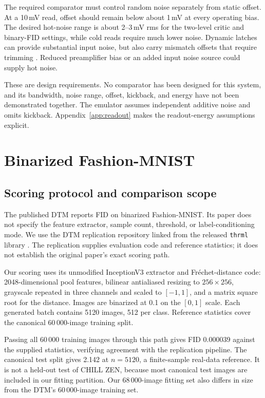 \documentclass[reprint,amsmath,amssymb,aps,pra,floatfix,nofootinbib]{revtex4-2}
\begin{document}
The required comparator must control random noise separately from static offset. At a 10\,mV read, offset should remain below about 1\,mV at every operating bias. The desired hot-noise range is about 2--3\,mV rms for the two-level critic and binary-FID settings, while cold reads require much lower noise. Dynamic latches can provide substantial input noise, but also carry mismatch offsets that require trimming \cite{razavi2015strongarm,pelgrom1989matching}. Reduced preamplifier bias or an added input noise source could supply hot noise.

These are design requirements. No comparator has been designed for this system, and its bandwidth, noise range, offset, kickback, and energy have not been demonstrated together. The emulator assumes independent additive noise and omits kickback. Appendix~\ref{app:readout} makes the readout-energy assumptions explicit.

\section{Binarized Fashion-MNIST}\label{sec:fid}
\subsection{Scoring protocol and comparison scope}
The published DTM reports FID \cite{heusel2017fid} on binarized Fashion-MNIST. Its paper does not specify the feature extractor, sample count, threshold, or label-conditioning mode. We use the DTM replication repository \cite{dtmreplication} linked from the released \texttt{thrml} library \cite{extropic2025thrml}. The replication supplies evaluation code and reference statistics; it does not establish the original paper's exact scoring path.

Our scoring uses its unmodified InceptionV3 extractor and Fr\'echet-distance code: 2048-dimensional pool features, bilinear antialiased resizing to $256\times256$, grayscale repeated in three channels and scaled to $[-1,1]$, and a matrix square root for the distance. Images are binarized at 0.1 on the $[0,1]$ scale. Each generated batch contains 5120 images, 512 per class. Reference statistics cover the canonical 60\,000-image training split.

Passing all 60\,000 training images through this path gives FID 0.000039 against the supplied statistics, verifying agreement with the replication pipeline. The canonical test split gives 2.142 at $n=5120$, a finite-sample real-data reference. It is not a held-out test of CHILL ZEN, because most canonical test images are included in our fitting partition. Our 68\,000-image fitting set also differs in size from the DTM's 60\,000-image training set.
\end{document}
